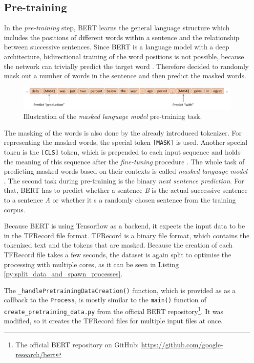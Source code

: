 \subsection{Pre-training}
In the \textit{pre-training} step, \ac{BERT} learns the general language structure which includes the positions of different words within a sentence and the relationship between successive sentences.
Since BERT is a language model with a deep architecture, bidirectional training of the word positions is not possible, because the network can trivially predict the target word \cite[p. 4]{Devlin2018}. %
Therefore \cite{Devlin2018} decided to randomly mask out a number of words in the sentence and then predict the masked words.
\begin{figure}[h]
    \centering
    \includegraphics[width=1.0\textwidth]{figures/illustration_masked_lm.png}
    \caption{Illustration of the \textit{masked language model} pre-training task.}
    \label{figure:masked_lm}
\end{figure}
The masking of the words is also done by the already introduced tokenizer.
For representing the masked words, the special token \texttt{[MASK]} is used.
Another special token is the \texttt{[CLS]} token, which is prepended to each input sequence and holds the meaning of this sequence after the \textit{fine-tuning} procedure \cite[p. 4]{Devlin2018}.
The whole task of predicting masked words based on their contexts is called \textit{masked language model} \cite[p. 4]{Devlin2018}.
The second task during pre-training is the binary \textit{next sentence prediction}.
For that, \ac{BERT} has to predict whether a sentence \textit{B} is the actual successive sentence to a sentence \textit{A} or whether it s a randomly chosen sentence from the training corpus.

Because \ac{BERT} is using Tensorflow as a backend, it expects the input data to be in the TFRecord file format.
TFRecord is a binary file format, which contains the tokenized text and the tokens that are masked.
Because the creation of each TFRecord file takes a few seconds, the dataset is again split to optimise the processing with multiple cores, as it can be seen in Listing \ref{py:split_data_and_spawn_processes}.

The \texttt{\_handlePretrainingDataCreation()} function, which is provided as as a callback to the \texttt{Process}, is mostly similar to the \texttt{main()} function of \texttt{create\_pretraining\_data.py} from the official \ac{BERT} repository\footnote{The official \ac{BERT} repository on GitHub: \url{https://github.com/google-research/bert}}.
It was modified, so it creates the TFRecord files for multiple input files at once.

